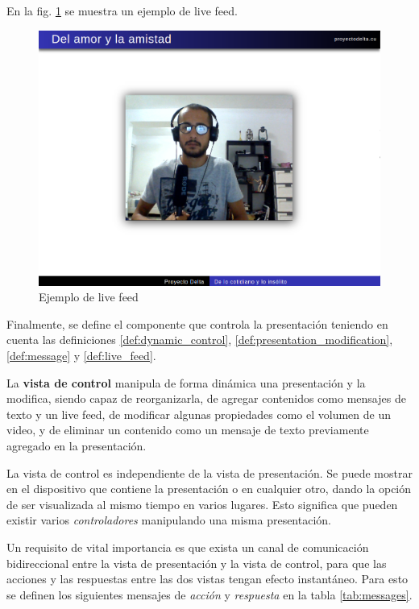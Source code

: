 		En la fig. \ref{fig:live_feed} se muestra un ejemplo de live feed.

		\begin{figure}[tb]
			\centering
			\includegraphics[width=12cm]{img/live_feed}
			\caption{Ejemplo de live feed}
			\label{fig:live_feed}
		\end{figure}

		Finalmente, se define el componente que controla la presentación teniendo en cuenta las definiciones \ref{def:dynamic_control}, \ref{def:presentation_modification}, \ref{def:message} y \ref{def:live_feed}.

		\begin{definition}
		\label{def:control_view}
			La \textbf{vista de control} manipula de forma dinámica una presentación y la modifica, siendo capaz de reorganizarla, de agregar contenidos como mensajes de texto y un live feed, de modificar algunas propiedades como el volumen de un video, y de eliminar un contenido como un mensaje de texto previamente agregado en la presentación. 
		\end{definition}		
		
		La vista de control es independiente de la vista de presentación. Se puede mostrar en el dispositivo que contiene la presentación o en cualquier otro, dando la opción de ser visualizada al mismo tiempo en varios lugares. Esto significa que pueden existir varios \textit{controladores} manipulando una misma presentación.

		Un requisito de vital importancia es que exista un canal de comunicación bidireccional entre la vista de presentación y la vista de control, para que las acciones y las respuestas entre las dos vistas tengan efecto instantáneo. Para esto se definen los siguientes mensajes de \textit{acción} y \textit{respuesta} en la tabla \ref{tab:messages}.

